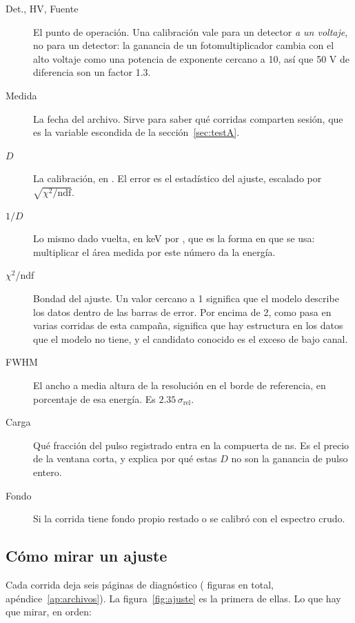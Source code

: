 \documentclass[11pt,a4paper]{article}
\begin{document}
\begin{description}
\item[Det., HV, Fuente] El punto de operación. Una calibración vale para un
      detector \emph{a un voltaje}, no para un detector: la ganancia de un
      fotomultiplicador cambia con el alto voltaje como una potencia de
      exponente cercano a 10, así que 50 V de diferencia son un factor 1.3.
\item[Medida] La fecha del archivo. Sirve para saber qué corridas comparten
      sesión, que es la variable escondida de la sección~\ref{sec:testA}.
\item[$D$] La calibración, en \DkeV. El error es el estadístico del ajuste,
      escalado por $\sqrt{\chi^2/\text{ndf}}$.
\item[$1/D$] Lo mismo dado vuelta, en keV por \mVns, que es la forma en que se
      usa: multiplicar el área medida por este número da la energía.
\item[$\chi^2$/ndf] Bondad del ajuste. Un valor cercano a 1 significa que el
      modelo describe los datos dentro de las barras de error. Por encima de 2,
      como pasa en varias corridas de esta campaña, significa que hay
      estructura en los datos que el modelo no tiene, y el candidato conocido
      es el exceso de bajo canal.
\item[FWHM] El ancho a media altura de la resolución en el borde de
      referencia, en porcentaje de esa energía. Es
      $2.35\,\sigma_{\text{rel}}$.
\item[Carga] Qué fracción del pulso registrado entra en la compuerta de
      \PostFijo{} ns. Es el precio de la ventana corta, y explica por qué estas
      $D$ no son la ganancia de pulso entero.
\item[Fondo] Si la corrida tiene fondo propio restado o se calibró con el
      espectro crudo.
\end{description}

\subsection{Cómo mirar un ajuste}
\label{sec:mirarajuste}

Cada corrida deja seis páginas de diagnóstico
(\NFigurasDiag{} figuras en total, apéndice~\ref{ap:archivos}). La
figura~\ref{fig:ajuste} es la primera de ellas. Lo que hay que mirar, en orden:
\end{document}
